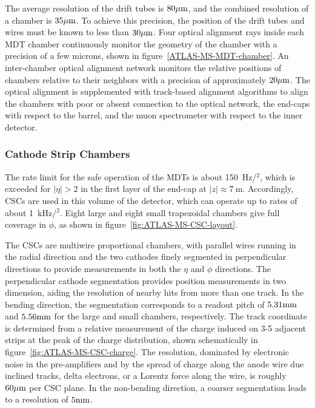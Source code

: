 The average resolution of the drift tubes is $80 \mu\mathrm{m}$, and the combined resolution of a chamber is $35 \mu\mathrm{m}$. To achieve this precision, the position of the drift tubes and wires must be known to less than $30 \mu\mathrm{m}$. Four optical alignment rays inside each MDT chamber continuously monitor the geometry of the chamber with a precision of a few microns, shown in figure~\ref{ATLAS-MS-MDT-chamber}. An inter-chamber optical alignment network monitors the relative positions of chambers relative to their neighbors with a precision of approximately $20 \mu\mathrm{m}$. The optical alignment is supplemented with track-based alignment algorithms to align the chambers with poor or absent connection to the optical network, the end-caps with respect to the barrel, and the muon spectrometer with respect to the inner detector.




\subsubsection{Cathode Strip Chambers}
The rate limit for the safe operation of the MDTs is about 150~Hz/\cm$^2$, which is exceeded for $|\eta|>2$ in the first layer of the end-cap at $|z|\approx 7~\mbox{m}$. Accordingly, CSCs are used in this volume of the detector, which can operate up to rates of about 1~kHz/\cm$^2$. Eight large and eight small trapezoidal chambers give full coverage in $\phi$, as shown in figure~\ref{fig:ATLAS-MS-CSC-layout}.  

The CSCs are multiwire proportional chambers, with parallel wires running in the radial direction and the two cathodes finely segmented in perpendicular directions to provide measurements in both the $\eta$ and $\phi$ directions. The perpendicular cathode segmentation provides position measurements in two dimension, aiding the resolution of nearby hits from more than one track. In the bending direction, the segmentation corresponds to a readout pitch of $5.31 \mathrm{mm}$ and $5.56 \mathrm{mm}$ for the large and small chambers, respectively.  The track coordinate is determined from a relative measurement of the charge induced on 3-5 adjacent strips at the peak of the charge distribution, shown schematically in figure~\ref{fig:ATLAS-MS-CSC-charge}. The resolution, dominated by electronic noise in the pre-amplifiers and by the spread of charge along the anode wire due inclined tracks, delta electrons, or a Lorentz force along the wire, is roughly $60 \mu\mathrm{m}$ per CSC plane. In the non-bending direction, a coarser segmentation leads to a resolution of $5 \mathrm{mm}$. 

